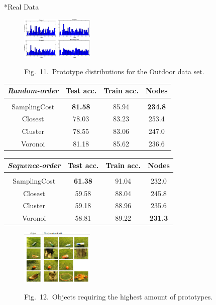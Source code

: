 \documentclass{article}
\makeatletter
\renewcommand{\subsection}{%
\@startsection{subsection}{1}{0pt}{2ex}{1ex}{%
\color[rgb]{0,0.4078,0.7059}
\fontsize{11mm}{11mm}\sffamily\bfseries}}
\makeatother
\begin{document}
\begin{multicols}{3}
\subsection*{Real Data}
\begin{figure}[H]
\includegraphics[width=0.31\textwidth]{Images/Outdoor/OutdoorPrototypeDistribution.png}
\begin{center}
{\myCaption Fig.~11.~Prototype distributions for the Outdoor data set.} 
\end{center}
\end{figure}

\begin{center}
\begin{tabular}{c|ccc}
\fontsize{8.5mm}{9.25mm}\sffamily
\textit{Random-order} & Test acc. & Train acc. & Nodes\\ \hline \\ [-1.5ex]
\rule{0pt}{10pt}
SamplingCost & \textbf{81.58} & 85.94 &\textbf{234.8}\\
Closest & 78.03 & 83.23 & 253.4\\
Cluster & 78.55 & 83.06 & 247.0\\
Voronoi & 81.18 & 85.62 & 236.6
\end{tabular}
\end{center}

\begin{center}
\fontsize{8.5mm}{9.25mm}\sffamily
\begin{tabular}{c|ccc}
\textit{Sequence-order} & Test acc. & Train acc. & Nodes\\ \hline \\ [-1.5ex]
\rule{0pt}{10pt}
SamplingCost & \textbf{61.38} & 91.04& 232.0\\
Closest & 59.58 & 88.04 & 245.8\\
Cluster & 59.18 & 88.96 & 235.6\\
Voronoi & 58.81 & 89.22 & \textbf{231.3}
\end{tabular}
\end{center}

\begin{figure}[H]
\begin{center}
\includegraphics[width=0.31\textwidth]{Images/General/DifficultObjects.png}
\end{center}
\begin{center}
{\myCaption Fig.~12.~Objects requiring the highest amount of prototypes.} 
\end{center}
\end{figure}


\end{multicols}
\end{document}
